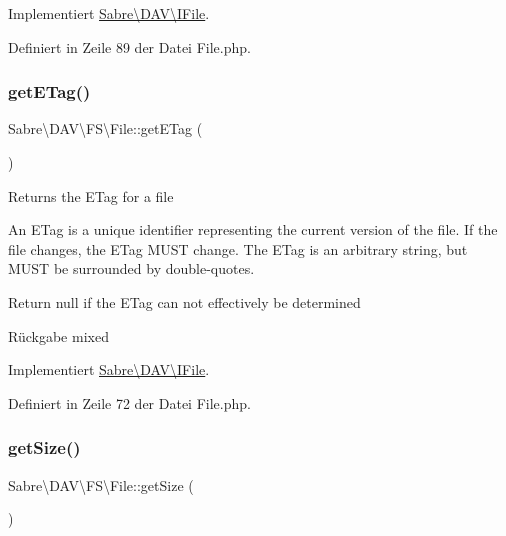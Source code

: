 Implementiert \mbox{\hyperlink{interface_sabre_1_1_d_a_v_1_1_i_file_aa76147e3e0ad228026dcb03035b499bc}{Sabre\textbackslash{}\+D\+A\+V\textbackslash{}\+I\+File}}.



Definiert in Zeile 89 der Datei File.\+php.

\mbox{\label{class_sabre_1_1_d_a_v_1_1_f_s_1_1_file_a133fec88700f329ed4aa9a7e6c1fd5cd}} 
\subsubsection{\texorpdfstring{get\+E\+Tag()}{getETag()}}
{\footnotesize\ttfamily Sabre\textbackslash{}\+D\+A\+V\textbackslash{}\+F\+S\textbackslash{}\+File\+::get\+E\+Tag (\begin{DoxyParamCaption}{ }\end{DoxyParamCaption})}

Returns the E\+Tag for a file

An E\+Tag is a unique identifier representing the current version of the file. If the file changes, the E\+Tag M\+U\+ST change. The E\+Tag is an arbitrary string, but M\+U\+ST be surrounded by double-\/quotes.

Return null if the E\+Tag can not effectively be determined

\begin{DoxyReturn}{Rückgabe}
mixed 
\end{DoxyReturn}


Implementiert \mbox{\hyperlink{interface_sabre_1_1_d_a_v_1_1_i_file_a2b207a6037dcbd4e7373b977dc60117f}{Sabre\textbackslash{}\+D\+A\+V\textbackslash{}\+I\+File}}.



Definiert in Zeile 72 der Datei File.\+php.

\mbox{\label{class_sabre_1_1_d_a_v_1_1_f_s_1_1_file_a5c081df437f59b33c8402123ceb45439}} 
\subsubsection{\texorpdfstring{get\+Size()}{getSize()}}
{\footnotesize\ttfamily Sabre\textbackslash{}\+D\+A\+V\textbackslash{}\+F\+S\textbackslash{}\+File\+::get\+Size (\begin{DoxyParamCaption}{ }\end{DoxyParamCaption})}

